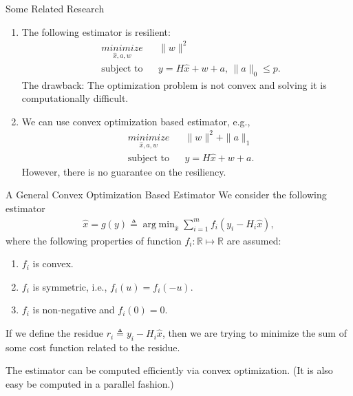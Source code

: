 \documentclass[10pt]{beamer}
\DeclareMathOperator{\argmin}{arg\;min}
\begin{document}
\begin{frame}{Some Related Research}
  \begin{enumerate}
  \item The following estimator is resilient:
    \begin{align*}
      & \mathop{\textit{minimize}}\limits_{\hat x,a,w}&
      & \|w\|^2 \\
      &\text{subject to}&
      &y = H \hat x + w + a,\,\|a\|_0\leq p.
    \end{align*}
    The drawback: The optimization problem is not convex and solving it is computationally difficult.
  \item We can use convex optimization based estimator, e.g., 
    \begin{align*}
      & \mathop{\textit{minimize}}\limits_{\hat x,a,w}&
      & \|w\|^2 + \|a\|_1 \\
      &\text{subject to}&
      &y = H \hat x + w + a.
    \end{align*}
    However, there is no guarantee on the resiliency.
  \end{enumerate}
\end{frame}

\begin{frame}{A General Convex Optimization Based Estimator}
  We consider the following estimator
  \begin{align*}
    \hat x = g(y) \triangleq \argmin_{\hat x} \sum_{i=1}^m f_i(y_i-H_i \hat x),
  \end{align*}
  where the following properties of function $f_i:\mathbb R\mapsto \mathbb R$ are assumed:
  \begin{enumerate}
  \item $f_i$ is convex.
  \item $f_i$ is symmetric, i.e., $f_i(u) = f_i(-u)$.
  \item $f_i$ is non-negative and $f_i(0) = 0$.
  \end{enumerate} 

  If we define the residue $r_i\triangleq y_i - H_i\hat x$, then we are trying to minimize the sum of some cost function related to the residue.

  The estimator can be computed efficiently via convex optimization. (It is also easy be computed in a parallel fashion.)
\end{frame}
\end{document}
